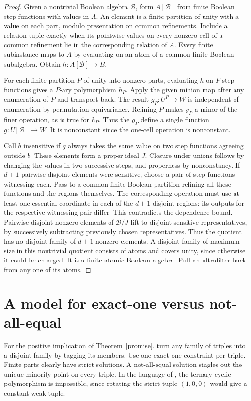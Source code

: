 \documentclass[11pt]{article}
\begin{document}
\begin{proof}
Given a nontrivial Boolean algebra $\mathcal B$, form $A[\mathcal B]$ from finite Boolean step functions with values in $A$. An element is a finite partition of unity with a value on each part, modulo presentation on common refinements. Include a relation tuple exactly when its pointwise values on every nonzero cell of a common refinement lie in the corresponding relation of $A$. Every finite subinstance maps to $A$ by evaluating on an atom of a common finite Boolean subalgebra. Obtain $h:A[\mathcal B]\to B$.

For each finite partition $P$ of unity into nonzero parts, evaluating $h$ on $P$-step functions gives a $P$-ary polymorphism $h_P$. Apply the given minion map after any enumeration of $P$ and transport back. The result $g_P:U^P\to W$ is independent of enumeration by permutation equivariance. Refining $P$ makes $g_P$ a minor of the finer operation, as is true for $h_P$. Thus the $g_P$ define a single function $g:U[\mathcal B]\to W$. It is nonconstant since the one-cell operation is nonconstant.

Call $b$ insensitive if $g$ always takes the same value on two step functions agreeing outside $b$. These elements form a proper ideal $J$. Closure under unions follows by changing the values in two successive steps, and properness by nonconstancy. If $d+1$ pairwise disjoint elements were sensitive, choose a pair of step functions witnessing each. Pass to a common finite Boolean partition refining all these functions and the regions themselves. The corresponding operation must use at least one essential coordinate in each of the $d+1$ disjoint regions: its outputs for the respective witnessing pair differ. This contradicts the dependence bound. Pairwise disjoint nonzero elements of $\mathcal B/J$ lift to disjoint sensitive representatives, by successively subtracting previously chosen representatives. Thus the quotient has no disjoint family of $d+1$ nonzero elements. A disjoint family of maximum size in this nontrivial quotient consists of atoms and covers unity, since otherwise it could be enlarged. It is a finite atomic Boolean algebra. Pull an ultrafilter back from any one of its atoms.
\end{proof}

\section{A model for exact-one versus not-all-equal}
For the positive implication of Theorem~\ref{promise}, turn any family of triples into a disjoint family by tagging its members. Use one exact-one constraint per triple. Finite parts clearly have strict solutions. A not-all-equal solution singles out the unique minority point on every triple. In the language of \cite[Lemma 4.1]{bodor}, the ternary cyclic polymorphism is impossible, since rotating the strict tuple $(1,0,0)$ would give a constant weak tuple.
\end{document}
